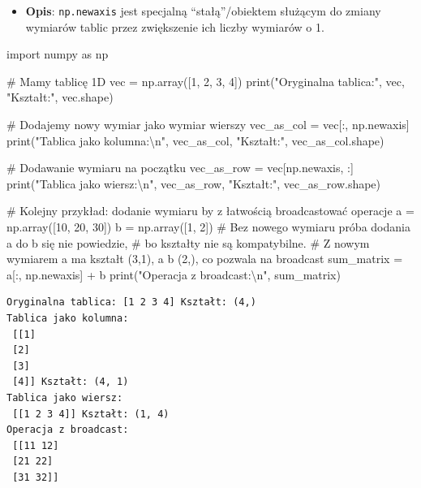 \documentclass[
  polish,
  letterpaper,
  DIV=11,
  numbers=noendperiod]{scrreprt}
\newenvironment{Shaded}{\begin{snugshade}}{\end{snugshade}}
\newcommand{\BuiltInTok}[1]{\textcolor[rgb]{0.00,0.23,0.31}{#1}}
\newcommand{\CharTok}[1]{\textcolor[rgb]{0.13,0.47,0.30}{#1}}
\newcommand{\CommentTok}[1]{\textcolor[rgb]{0.37,0.37,0.37}{#1}}
\newcommand{\DecValTok}[1]{\textcolor[rgb]{0.68,0.00,0.00}{#1}}
\newcommand{\ImportTok}[1]{\textcolor[rgb]{0.00,0.46,0.62}{#1}}
\newcommand{\NormalTok}[1]{\textcolor[rgb]{0.00,0.23,0.31}{#1}}
\newcommand{\OperatorTok}[1]{\textcolor[rgb]{0.37,0.37,0.37}{#1}}
\newcommand{\StringTok}[1]{\textcolor[rgb]{0.13,0.47,0.30}{#1}}
\providecommand{\tightlist}{%
  \setlength{\itemsep}{0pt}\setlength{\parskip}{0pt}}
\begin{document}
\begin{itemize}
\tightlist
\item
  \textbf{Opis}: \texttt{np.newaxis} jest specjalną ``stałą''/obiektem
  służącym do zmiany wymiarów tablic przez zwiększenie ich liczby
  wymiarów o 1.
\end{itemize}

\begin{Shaded}
\begin{Highlighting}[]
\ImportTok{import}\NormalTok{ numpy }\ImportTok{as}\NormalTok{ np}

\CommentTok{\# Mamy tablicę 1D}
\NormalTok{vec }\OperatorTok{=}\NormalTok{ np.array([}\DecValTok{1}\NormalTok{, }\DecValTok{2}\NormalTok{, }\DecValTok{3}\NormalTok{, }\DecValTok{4}\NormalTok{])}
\BuiltInTok{print}\NormalTok{(}\StringTok{"Oryginalna tablica:"}\NormalTok{, vec, }\StringTok{"Kształt:"}\NormalTok{, vec.shape)}

\CommentTok{\# Dodajemy nowy wymiar jako wymiar wierszy}
\NormalTok{vec\_as\_col }\OperatorTok{=}\NormalTok{ vec[:, np.newaxis]}
\BuiltInTok{print}\NormalTok{(}\StringTok{"Tablica jako kolumna:}\CharTok{\textbackslash{}n}\StringTok{"}\NormalTok{, vec\_as\_col, }\StringTok{"Kształt:"}\NormalTok{, vec\_as\_col.shape)}

\CommentTok{\# Dodawanie wymiaru na początku}
\NormalTok{vec\_as\_row }\OperatorTok{=}\NormalTok{ vec[np.newaxis, :]}
\BuiltInTok{print}\NormalTok{(}\StringTok{"Tablica jako wiersz:}\CharTok{\textbackslash{}n}\StringTok{"}\NormalTok{, vec\_as\_row, }\StringTok{"Kształt:"}\NormalTok{, vec\_as\_row.shape)}

\CommentTok{\# Kolejny przykład: dodanie wymiaru by z łatwością broadcastować operacje}
\NormalTok{a }\OperatorTok{=}\NormalTok{ np.array([}\DecValTok{10}\NormalTok{, }\DecValTok{20}\NormalTok{, }\DecValTok{30}\NormalTok{])}
\NormalTok{b }\OperatorTok{=}\NormalTok{ np.array([}\DecValTok{1}\NormalTok{, }\DecValTok{2}\NormalTok{])}
\CommentTok{\# Bez nowego wymiaru próba dodania a do b się nie powiedzie, }
\CommentTok{\# bo kształty nie są kompatybilne.}
\CommentTok{\# Z nowym wymiarem a ma kształt (3,1), a b (2,), co pozwala na broadcast}
\NormalTok{sum\_matrix }\OperatorTok{=}\NormalTok{ a[:, np.newaxis] }\OperatorTok{+}\NormalTok{ b}
\BuiltInTok{print}\NormalTok{(}\StringTok{"Operacja z broadcast:}\CharTok{\textbackslash{}n}\StringTok{"}\NormalTok{, sum\_matrix)}
\end{Highlighting}
\end{Shaded}

\begin{verbatim}
Oryginalna tablica: [1 2 3 4] Kształt: (4,)
Tablica jako kolumna:
 [[1]
 [2]
 [3]
 [4]] Kształt: (4, 1)
Tablica jako wiersz:
 [[1 2 3 4]] Kształt: (1, 4)
Operacja z broadcast:
 [[11 12]
 [21 22]
 [31 32]]
\end{verbatim}
\end{document}
